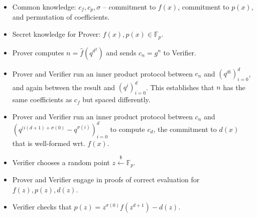 \documentclass{article}
\theoremstyle{definition}
\begin{document}
\begin{itemize}
    \item Common knowledge: $c_f, c_p, \sigma$ -- commitment to $f(x)$, commitment to $p(x)$, and permutation of coefficients.
    \item Secret knowledge for Prover: $f(x), p(x) \in \mathbb{F}_p$.
    \item Prover computes $n = \hat{f}(q^{d^2})$ and sends $c_n = g^n$ to Verifier.
    \item Prover and Verifier run an inner product protocol between $c_n$ and $(q^{di})_{i=0}^d$, and again between the result and $(q^i)_{i=0}^d$. This establishes that $n$ has the same coefficients as $c_f$ but spaced differently.
    \item Prover and Verifier run an inner product protocol between $c_n$ and $(q^{(i(d+1) + \sigma(0)} - q^{\sigma(i)})_{i=0}^d$ to compute $c_d$, the commitment to $d(x)$ that is well-formed wrt. $f(x)$.
    \item Verifier chooses a random point $z \xleftarrow{\$} \mathbb{F}_p$.
    \item Prover and Verifier engage in proofs of correct evaluation for $f(z), p(z), d(z)$.
    \item Verifier checks that $p(z) = z^{\sigma(0)} f(z^{d+1}) - d(z)$.
\end{itemize}
\end{document}
